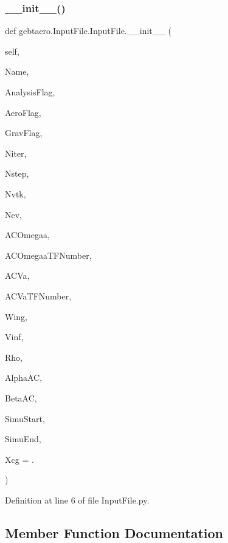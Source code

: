 \subsubsection{\texorpdfstring{\+\_\+\+\_\+init\+\_\+\+\_\+()}{\_\_init\_\_()}}
{\footnotesize\ttfamily def gebtaero.\+Input\+File.\+Input\+File.\+\_\+\+\_\+init\+\_\+\+\_\+ (\begin{DoxyParamCaption}\item[{}]{self,  }\item[{}]{Name,  }\item[{}]{Analysis\+Flag,  }\item[{}]{Aero\+Flag,  }\item[{}]{Grav\+Flag,  }\item[{}]{Niter,  }\item[{}]{Nstep,  }\item[{}]{Nvtk,  }\item[{}]{Nev,  }\item[{}]{A\+C\+Omegaa,  }\item[{}]{A\+C\+Omegaa\+T\+F\+Number,  }\item[{}]{A\+C\+Va,  }\item[{}]{A\+C\+Va\+T\+F\+Number,  }\item[{}]{Wing,  }\item[{}]{Vinf,  }\item[{}]{Rho,  }\item[{}]{Alpha\+AC,  }\item[{}]{Beta\+AC,  }\item[{}]{Simu\+Start,  }\item[{}]{Simu\+End,  }\item[{}]{Xcg = {.} }\end{DoxyParamCaption})}



Definition at line 6 of file Input\+File.\+py.



\subsection{Member Function Documentation}
\mbox{\label{classgebtaero_1_1_input_file_1_1_input_file_a3cf4d7178dc0471896e7c60f6c17e906}} 
